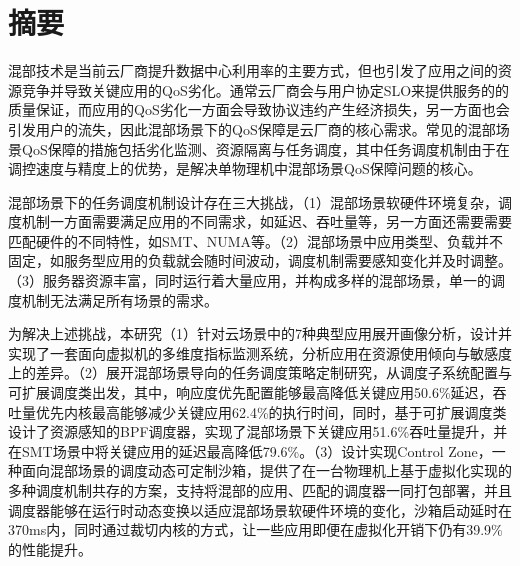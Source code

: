 
\maketitle%
\MAKETITLE%
\makedeclaration%
\intobmk\chapter*{摘\quad 要}%
\setcounter{page}{1}%


混部技术是当前云厂商提升数据中心利用率的主要方式，但也引发了应用之间的资源竞争并导致关键应用的QoS劣化。通常云厂商会与用户协定SLO来提供服务的的质量保证，而应用的QoS劣化一方面会导致协议违约产生经济损失，另一方面也会引发用户的流失，因此混部场景下的QoS保障是云厂商的核心需求。常见的混部场景QoS保障的措施包括劣化监测、资源隔离与任务调度，其中任务调度机制由于在调控速度与精度上的优势，是解决单物理机中混部场景QoS保障问题的核心。

混部场景下的任务调度机制设计存在三大挑战，（1）混部场景软硬件环境复杂，调度机制一方面需要满足应用的不同需求，如延迟、吞吐量等，另一方面还需要需要匹配硬件的不同特性，如SMT、NUMA等。（2）混部场景中应用类型、负载并不固定，如服务型应用的负载就会随时间波动，调度机制需要感知变化并及时调整。（3）服务器资源丰富，同时运行着大量应用，并构成多样的混部场景，单一的调度机制无法满足所有场景的需求。

为解决上述挑战，本研究（1）针对云场景中的7种典型应用展开画像分析，设计并实现了一套面向虚拟机的多维度指标监测系统，分析应用在资源使用倾向与敏感度上的差异。（2）展开混部场景导向的任务调度策略定制研究，从调度子系统配置与可扩展调度类出发，其中，响应度优先配置能够最高降低关键应用50.6\%延迟，吞吐量优先内核最高能够减少关键应用62.4\%的执行时间，同时，基于可扩展调度类设计了资源感知的BPF调度器，实现了混部场景下关键应用51.6\%吞吐量提升，并在SMT场景中将关键应用的延迟最高降低79.6\%。（3）设计实现Control Zone，一种面向混部场景的调度动态可定制沙箱，提供了在一台物理机上基于虚拟化实现的多种调度机制共存的方案，支持将混部的应用、匹配的调度器一同打包部署，并且调度器能够在运行时动态变换以适应混部场景软硬件环境的变化，沙箱启动延时在370ms内，同时通过裁切内核的方式，让一些应用即便在虚拟化开销下仍有39.9\%的性能提升。

